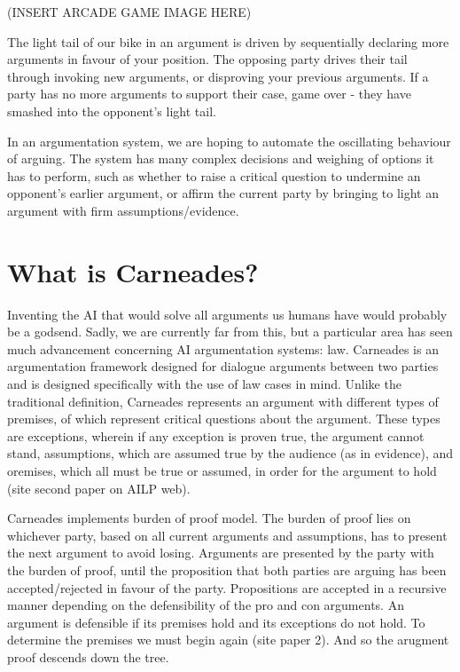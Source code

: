 \documentclass[10pt,a4paper,twocolumn]{article}
\begin{document}
(INSERT ARCADE GAME IMAGE HERE)

The light tail of our bike in an argument is driven by sequentially declaring
more arguments in favour of your position. The opposing party drives their tail
through invoking new arguments, or disproving your previous arguments. If
a party has no more arguments to support their case, game over - they have
smashed into the opponent's light tail.

In an argumentation system, we are hoping to automate the oscillating behaviour
of arguing. The system has many complex decisions and weighing of options it has
to perform, such as whether to raise a critical question to undermine an
opponent's earlier argument, or affirm the current party by bringing to light an
argument with firm assumptions/evidence.

\section{What is Carneades?}

Inventing the AI that would solve all arguments us humans have would probably be
a godsend. Sadly, we are currently far from this, but a particular area has seen
much advancement concerning AI argumentation systems: law. Carneades is an
argumentation framework designed for dialogue arguments between two parties and
is designed specifically with the use of law cases in mind. Unlike the
traditional definition, Carneades represents an argument with different types of
premises, of which represent critical questions about the argument. These types
are exceptions, wherein if any exception is proven true, the argument cannot
stand, assumptions, which are assumed true by the audience (as in evidence), and
oremises, which all must be true or assumed, in order for the argument to hold
(site second paper on AILP web).

Carneades implements burden of proof model. The burden of proof lies on
whichever party, based on all current arguments and assumptions, has to present the
next argument to avoid losing. Arguments are presented by the party with the
burden of proof, until the proposition that both parties are arguing has been
accepted/rejected in favour of the party. Propositions are accepted in
a recursive manner depending on the defensibility of the pro and con arguments.
An argument is defensible if its premises hold and its exceptions do not hold.
To determine the premises we must begin again (site paper 2). And so the
arugment proof descends down the tree.
\end{document}
